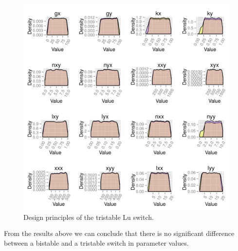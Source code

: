 \begin{figure}[h]
\centering
\includegraphics[scale=0.2]{chapterModelling/Lu_switches/images/double_pos/design_principles_bi_tri.png}
\caption{Design principles of the tristable Lu switch.}
\label{fig:design_princip_lu}
\end{figure}

From the results above we can conclude that there is no significant difference between a bistable and a tristable switch in parameter values. 

